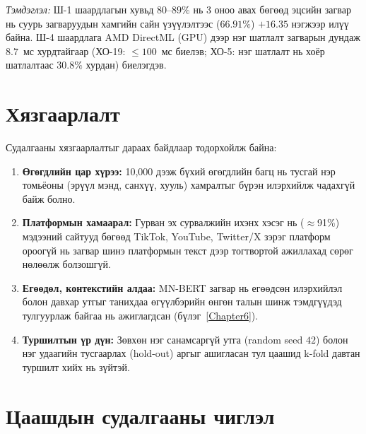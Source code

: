\textit{Тэмдэглэл:} Ш-1 шаардлагын хувьд $80$--$89\%$ нь 3 оноо авах бөгөөд эцсийн загвар нь суурь загваруудын хамгийн сайн үзүүлэлтээс ($66.91\%$) $+16.35$ нэгжээр илүү байна. Ш-4 шаардлага AMD DirectML (GPU) дээр нэг шатлалт загварын дундаж $8.7$~мс хурдтайгаар (ХО-19: ${\leq}100$~мс биелэв; ХО-5: нэг шатлалт нь хоёр шатлалтаас $30.8\%$ хурдан) биелэгдэв.

\section{Хязгаарлалт}

Судалгааны хязгаарлалтыг дараах байдлаар тодорхойлж байна:

\begin{enumerate}
  \item \textbf{Өгөгдлийн цар хүрээ:} 10,000 дээж бүхий өгөгдлийн багц нь
    тусгай нэр томьёоны (эрүүл мэнд, санхүү, хууль) хамралтыг бүрэн
    илэрхийлж чадахгүй байж болно.
  \item \textbf{Платформын хамаарал:} Гурван эх сурвалжийн ихэнх хэсэг нь ($\approx$91\%)
    мэдээний сайтууд бөгөөд TikTok, YouTube, Twitter/X зэрэг платформ ороогүй
    нь загвар шинэ платформын текст дээр тогтвортой ажиллахад сөрөг нөлөөлж болзошгүй.
  \item \textbf{Егөөдөл, контекстийн алдаа:} MN-BERT загвар нь егөөдсөн илэрхийлэл болон давхар утгыг танихдаа өгүүлбэрийн өнгөн талын шинж тэмдгүүдэд тулгуурлаж байгаа нь ажиглагдсан (бүлэг~\ref{Chapter6}).
    \item \textbf{Туршилтын үр дүн:} Зөвхөн нэг санамсаргүй утга (random seed $42$) болон нэг удаагийн тусгаарлах (hold-out) аргыг ашигласан тул цаашид k-fold давтан туршилт хийх нь зүйтэй.
  \end{enumerate}

  \section{Цаашдын судалгааны чиглэл}

